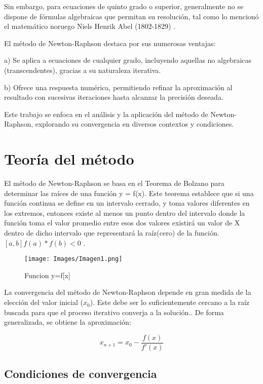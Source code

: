 \documentclass[conference]{IEEEtran}
\begin{document}
Sin embargo, para ecuaciones de quinto grado o superior, generalmente no se dispone de fórmulas algebraicas que permitan su resolución, tal como lo mencionó el matemático noruego Niels Henrik Abel (1802-1829) \cite{finney1980calculus}.

El método de Newton-Raphson destaca por sus numerosas ventajas:

a) Se aplica a ecuaciones de cualquier grado, incluyendo aquellas no algebraicas (transcendentes), gracias a su naturaleza iterativa.

b) Ofrece una respuesta numérica, permitiendo refinar la aproximación al resultado con sucesivas iteraciones hasta alcanzar la precisión deseada.

Este trabajo se enfoca en el análisis y la aplicación del método de Newton-Raphson, explorando su convergencia en diversos contextos y condiciones.





\section{Teoría del método}

El método de Newton-Raphson se basa en el Teorema de Bolzano para determinar las raíces de una función y = f(x). Este teorema establece que si una función continua se define en un intervalo cerrado, y toma valores diferentes en los extremos, entonces existe al menos un punto dentro del intervalo donde la función toma el valor promedio entre esos dos valores   existirá  un  valor de X dentro de dicho intervalo que representará la raíz(cero) de la función.  $[a,b]  f(a)*f(b)<0$
\cite{spivak1970calculus}.

\begin{figure} [h]
    \centering
    \texttt{[image: Images/Imagen1.png]}
    \caption{Funcion y=f[x]}
    \label{fig:fig1}
\end{figure}

La convergencia del método de Newton-Raphson depende en gran medida de la elección del valor inicial ($x_0$). Este debe ser lo suficientemente cercano a la raíz buscada para que el proceso iterativo converja a la solución.. De forma generalizada, se obtiene la aproximación:

\begin{equation}
	x_{n + 1} = x_0 - \frac{f(x)}{f'(x)}
\end{equation}

\subsection{Condiciones de convergencia}
\end{document}

